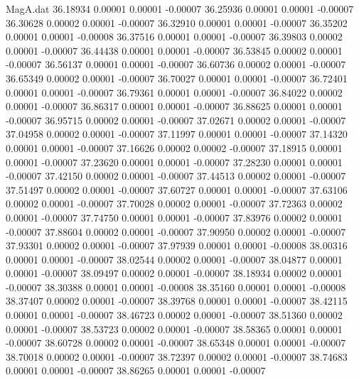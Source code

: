 \begin{filecontents}{MagA.dat}
  36.18934    0.00001    0.00001   -0.00007
  36.25936    0.00001    0.00001   -0.00007
  36.30628    0.00002    0.00001   -0.00007
  36.32910    0.00001    0.00001   -0.00007
  36.35202    0.00001    0.00001   -0.00008
  36.37516    0.00001    0.00001   -0.00007
  36.39803    0.00002    0.00001   -0.00007
  36.44438    0.00001    0.00001   -0.00007
  36.53845    0.00002    0.00001   -0.00007
  36.56137    0.00001    0.00001   -0.00007
  36.60736    0.00002    0.00001   -0.00007
  36.65349    0.00002    0.00001   -0.00007
  36.70027    0.00001    0.00001   -0.00007
  36.72401    0.00001    0.00001   -0.00007
  36.79361    0.00001    0.00001   -0.00007
  36.84022    0.00002    0.00001   -0.00007
  36.86317    0.00001    0.00001   -0.00007
  36.88625    0.00001    0.00001   -0.00007
  36.95715    0.00002    0.00001   -0.00007
  37.02671    0.00002    0.00001   -0.00007
  37.04958    0.00002    0.00001   -0.00007
  37.11997    0.00001    0.00001   -0.00007
  37.14320    0.00001    0.00001   -0.00007
  37.16626    0.00002    0.00002   -0.00007
  37.18915    0.00001    0.00001   -0.00007
  37.23620    0.00001    0.00001   -0.00007
  37.28230    0.00001    0.00001   -0.00007
  37.42150    0.00002    0.00001   -0.00007
  37.44513    0.00002    0.00001   -0.00007
  37.51497    0.00002    0.00001   -0.00007
  37.60727    0.00001    0.00001   -0.00007
  37.63106    0.00002    0.00001   -0.00007
  37.70028    0.00002    0.00001   -0.00007
  37.72363    0.00002    0.00001   -0.00007
  37.74750    0.00001    0.00001   -0.00007
  37.83976    0.00002    0.00001   -0.00007
  37.88604    0.00002    0.00001   -0.00007
  37.90950    0.00002    0.00001   -0.00007
  37.93301    0.00002    0.00001   -0.00007
  37.97939    0.00001    0.00001   -0.00008
  38.00316    0.00001    0.00001   -0.00007
  38.02544    0.00002    0.00001   -0.00007
  38.04877    0.00001    0.00001   -0.00007
  38.09497    0.00002    0.00001   -0.00007
  38.18934    0.00002    0.00001   -0.00007
  38.30388    0.00001    0.00001   -0.00008
  38.35160    0.00001    0.00001   -0.00008
  38.37407    0.00002    0.00001   -0.00007
  38.39768    0.00001    0.00001   -0.00007
  38.42115    0.00001    0.00001   -0.00007
  38.46723    0.00002    0.00001   -0.00007
  38.51360    0.00002    0.00001   -0.00007
  38.53723    0.00002    0.00001   -0.00007
  38.58365    0.00001    0.00001   -0.00007
  38.60728    0.00002    0.00001   -0.00007
  38.65348    0.00001    0.00001   -0.00007
  38.70018    0.00002    0.00001   -0.00007
  38.72397    0.00002    0.00001   -0.00007
  38.74683    0.00001    0.00001   -0.00007
  38.86265    0.00001    0.00001   -0.00007

\end{filecontents}
